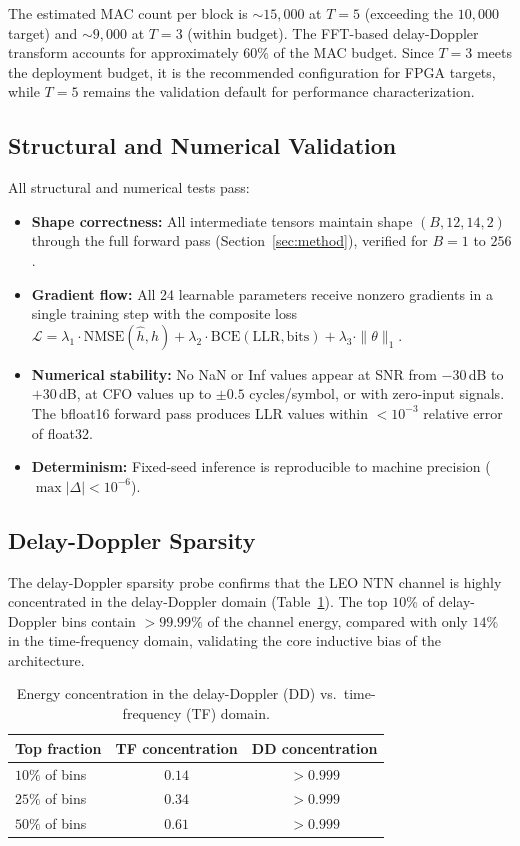 \documentclass{article}
\begin{document}
The estimated MAC count per block is $\sim 15{,}000$ at $T=5$ (exceeding the $10{,}000$ target) and $\sim 9{,}000$ at $T=3$ (within budget). The FFT-based delay-Doppler transform accounts for approximately $60\%$ of the MAC budget. Since $T=3$ meets the deployment budget, it is the recommended configuration for FPGA targets, while $T=5$ remains the validation default for performance characterization. %

\subsection{Structural and Numerical Validation}

All structural and numerical tests pass:
\begin{itemize}
  \item \textbf{Shape correctness:} All intermediate tensors maintain shape $(B, 12, 14, 2)$ through the full forward pass (Section~\ref{sec:method}), verified for $B = 1$ to $256$.
  \item \textbf{Gradient flow:} All 24 learnable parameters receive nonzero gradients in a single training step with the composite loss $\mathcal{L} = \lambda_1 \cdot \mathrm{NMSE}(\hat{h}, h) + \lambda_2 \cdot \mathrm{BCE}(\mathrm{LLR}, \mathrm{bits}) + \lambda_3 \cdot \|\theta\|_1$.
  \item \textbf{Numerical stability:} No NaN or Inf values appear at SNR from $-30$\,dB to $+30$\,dB, at CFO values up to $\pm 0.5$ cycles/symbol, or with zero-input signals. The bfloat16 forward pass produces LLR values within $< 10^{-3}$ relative error of float32.
  \item \textbf{Determinism:} Fixed-seed inference is reproducible to machine precision ($\max|\Delta| < 10^{-6}$).
\end{itemize}

\subsection{Delay-Doppler Sparsity}

The delay-Doppler sparsity probe confirms that the LEO NTN channel is highly concentrated in the delay-Doppler domain (Table~\ref{tab:sparsity}). The top $10\%$ of delay-Doppler bins contain $> 99.99\%$ of the channel energy, compared with only $14\%$ in the time-frequency domain, validating the core inductive bias of the architecture.

\begin{table}[h]
  \centering
  \caption{Energy concentration in the delay-Doppler (DD) vs.\ time-frequency (TF) domain.}
  \label{tab:sparsity}
  \begin{tabular}{@{}lcc@{}}
    \toprule
    Top fraction & TF concentration & DD concentration \\
    \midrule
    $10\%$ of bins & $0.14$ & $> 0.999$ \\
    $25\%$ of bins & $0.34$ & $> 0.999$ \\
    $50\%$ of bins & $0.61$ & $> 0.999$ \\
    \bottomrule
  \end{tabular}
\end{table}
\end{document}
